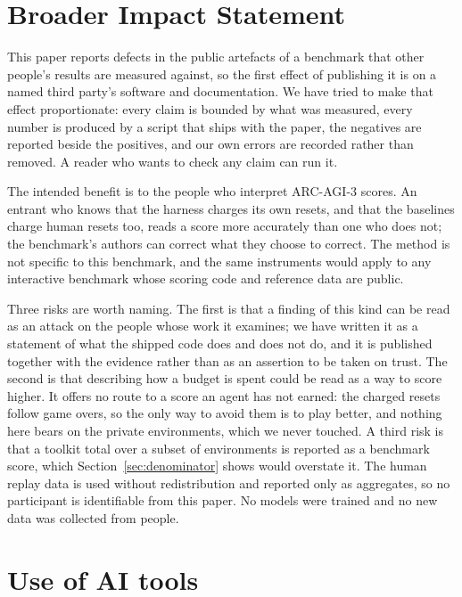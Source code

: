 \documentclass[11pt]{article}
\begin{document}
\section*{Broader Impact Statement}

This paper reports defects in the public artefacts of a benchmark that other
people's results are measured against, so the first effect of publishing it is
on a named third party's software and documentation. We have tried to make that
effect proportionate: every claim is bounded by what was measured, every number
is produced by a script that ships with the paper, the negatives are reported
beside the positives, and our own errors are recorded rather than removed. A
reader who wants to check any claim can run it.

The intended benefit is to the people who interpret ARC-AGI-3 scores. An
entrant who knows that the harness charges its own resets, and that the
baselines charge human resets too, reads a score more accurately than one who
does not; the benchmark's authors can correct what they choose to correct. The
method is not specific to this benchmark, and the same instruments would apply
to any interactive benchmark whose scoring code and reference data are public.

Three risks are worth naming. The first is that a finding of this kind can be
read as an attack on the people whose work it examines; we have written it as a
statement of what the shipped code does and does not do, and it is published
together with the evidence rather than as an assertion to be taken on trust. The
second is that describing how a budget is spent could be read as a way to score
higher. It offers no route to a score an agent has not earned: the charged
resets follow game overs, so the only way to avoid them is to play better, and
nothing here bears on the private environments, which we never touched. A third risk is
that a toolkit total over a subset of environments is reported as a benchmark
score, which Section~\ref{sec:denominator} shows would overstate it. The
human replay data is used without redistribution and reported only as
aggregates, so no participant is identifiable from this paper. No models were
trained and no new data was collected from people.

\section{Use of AI tools}
\label{sec:ai}
\end{document}

